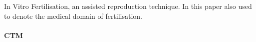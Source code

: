 \paragraph{\IVF{}} \\
In Vitro Fertilisation, an assisted reproduction technique.
In this paper also used to denote the medical domain of fertilisation.

\paragraph{\PRN{}}

\paragraph{\project{}}

\paragraph{\projectdata{}}

\paragraph{\ivfsystem{}}

\paragraph{\ivfprototype{}}

\paragraph{CTM}
